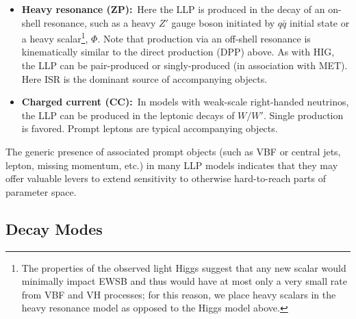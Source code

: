 \begin{itemize}
\item {\bf Heavy resonance (ZP):}~Here the LLP is produced in the decay of an on-shell resonance, such as a heavy $Z'$ gauge boson initiated by $q\bar{q}$ initial state or a heavy scalar\footnote{The properties of the observed light Higgs suggest that any new scalar would minimally impact EWSB and thus would have at most only a very small rate from VBF and VH processes; for this reason, we place heavy scalars in the heavy resonance model as opposed to the Higgs model above.}, $\Phi$.  Note that production via an off-shell resonance is kinematically similar to the direct production (DPP) above.  As with HIG, the LLP can be pair-produced or singly-produced (in association with MET). Here ISR is the dominant source of accompanying objects.
\item {\bf Charged current (CC):}~In models with weak-scale right-handed neutrinos, the LLP can be produced in the leptonic decays of $W/W'$. Single production is favored.  Prompt leptons are typical accompanying objects.
\end{itemize}
%

The generic presence of associated prompt objects (such as VBF or central jets, lepton, missing momentum, etc.) in many LLP models indicates that they may offer valuable levers to extend sensitivity to otherwise hard-to-reach parts of parameter space.

\subsection{Decay Modes}


